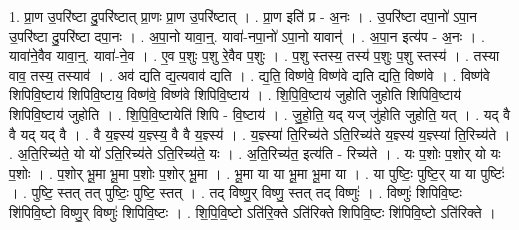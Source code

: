 \documentclass[17pt]{extarticle}
\begin{document}
1. प्रा॒ण उ॒परि॑ष्टा दु॒परि॑ष्टात् प्रा॒णः प्रा॒ण उ॒परि॑ष्टात् । . प्रा॒ण इति॑ प्र - अ॒नः । . उ॒परि॑ष्टा दपा॒नो॑ ऽपा॒न उ॒परि॑ष्टा दु॒परि॑ष्टा दपा॒नः । . अ॒पा॒नो यावा॒न्॒. यावा॑-नपा॒नो॑ ऽपा॒नो यावान्॑ । . अ॒पा॒न इत्य॑प - अ॒नः । . यावा॑ने॒वैव यावा॒न्॒. यावा॑-ने॒व । . ए॒व प॒शुः प॒शु रे॒वैव प॒शुः । . प॒शु स्तस्य॒ तस्य॑ प॒शुः प॒शु स्तस्य॑ । . तस्या वाव॒ तस्य॒ तस्याव॑ । . अव॑ द्यति द्य॒त्यवाव॑ द्यति । . द्य॒ति॒ विष्ण॑वे॒ विष्ण॑वे द्यति द्यति॒ विष्ण॑वे । . विष्ण॑वे शिपिवि॒ष्टाय॑ शिपिवि॒ष्टाय॒ विष्ण॑वे॒ विष्ण॑वे शिपिवि॒ष्टाय॑ । . शि॒पि॒वि॒ष्टाय॑ जुहोति जुहोति शिपिवि॒ष्टाय॑ शिपिवि॒ष्टाय॑ जुहोति । . शि॒पि॒वि॒ष्टायेति॑ शिपि - वि॒ष्टाय॑ । . जु॒हो॒ति॒ यद् यज् जु॑होति जुहोति॒ यत् । . यद् वै वै यद् यद् वै । . वै य॒ज्ञ्स्य॑ य॒ज्ञ्स्य॒ वै वै य॒ज्ञ्स्य॑ । . य॒ज्ञ्स्या॑ ति॒रिच्य॑ते ऽति॒रिच्य॑ते य॒ज्ञ्स्य॑ य॒ज्ञ्स्या॑ ति॒रिच्य॑ते । . अ॒ति॒रिच्य॑ते॒ यो यो॑ ऽति॒रिच्य॑ते ऽति॒रिच्य॑ते॒ यः । . अ॒ति॒रिच्य॑त॒ इत्य॑ति - रिच्य॑ते । . यः प॒शोः प॒शोर् यो यः प॒शोः । . प॒शोर् भू॒मा भू॒मा प॒शोः प॒शोर् भू॒मा । . भू॒मा या या भू॒मा भू॒मा या । . या पुष्टिः॒ पुष्टि॒र् या या पुष्टिः॑ । . पुष्टि॒ स्तत् तत् पुष्टिः॒ पुष्टि॒ स्तत् । . तद् विष्णु॒र् विष्णु॒ स्तत् तद् विष्णुः॑ । . विष्णुः॑ शिपिवि॒ष्टः शि॑पिवि॒ष्टो विष्णु॒र् विष्णुः॑ शिपिवि॒ष्टः । . शि॒पि॒वि॒ष्टो ऽति॑रि॒क्ते ऽति॑रिक्ते शिपिवि॒ष्टः शि॑पिवि॒ष्टो ऽति॑रिक्ते । \newline
\end{document}
